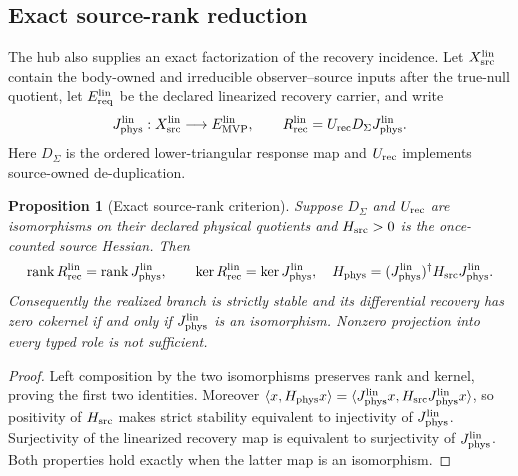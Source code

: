 \documentclass[11pt]{article}
\newtheorem{proposition}{Proposition}
\begin{document}
\subsection{Exact source-rank reduction}

The hub also supplies an exact factorization of the recovery incidence.  Let
$X_{\rm src}^{\rm lin}$ contain the body-owned and irreducible
observer--source inputs after the true-null quotient, let
$E_{\rm req}^{\rm lin}$ be the declared linearized recovery carrier, and write
\begin{equation}
J_{\rm phys}^{\rm lin}:X_{\rm src}^{\rm lin}
\longrightarrow E_{\rm MVP}^{\rm lin},
\qquad
R_{\rm rec}^{\rm lin}=U_{\rm rec}D_\Sigma J_{\rm phys}^{\rm lin}.
\label{eq:recoveryfactorization}
\end{equation}
Here $D_\Sigma$ is the ordered lower-triangular response map and $U_{\rm rec}$
implements source-owned de-duplication.

\begin{proposition}[Exact source-rank criterion]
\label{prop:sourcerank}
Suppose $D_\Sigma$ and $U_{\rm rec}$ are isomorphisms on their declared
physical quotients and $H_{\rm src}>0$ is the once-counted source Hessian.
Then
\begin{equation}
\operatorname{rank}R_{\rm rec}^{\rm lin}
=\operatorname{rank}J_{\rm phys}^{\rm lin},
\qquad
\ker R_{\rm rec}^{\rm lin}=\ker J_{\rm phys}^{\rm lin},
\quad
H_{\rm phys}=(J_{\rm phys}^{\rm lin})^\dagger
H_{\rm src}J_{\rm phys}^{\rm lin}.
\label{eq:sourcerankcriterion}
\end{equation}
Consequently the realized branch is strictly stable and its differential
recovery has zero cokernel if and only if $J_{\rm phys}^{\rm lin}$ is an
isomorphism. Nonzero projection into every typed role is not sufficient.
\end{proposition}

\begin{proof}
Left composition by the two isomorphisms preserves rank and kernel, proving
the first two identities.  Moreover
$\langle x,H_{\rm phys}x\rangle
=\langle J_{\rm phys}^{\rm lin}x,H_{\rm src}
J_{\rm phys}^{\rm lin}x\rangle$, so positivity of
$H_{\rm src}$ makes strict stability equivalent to injectivity of
$J_{\rm phys}^{\rm lin}$. Surjectivity of the linearized recovery map is
equivalent to surjectivity of $J_{\rm phys}^{\rm lin}$. Both properties hold
exactly when the latter map is an isomorphism.
\end{proof}
\end{document}
